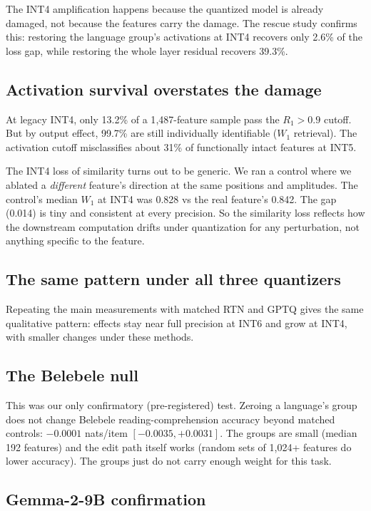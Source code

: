 \documentclass[11pt]{article}
\begin{document}
The INT4 amplification happens because the quantized model is already damaged, not because the features carry the damage. The rescue study confirms this: restoring the language group's activations at INT4 recovers only 2.6\% of the loss gap, while restoring the whole layer residual recovers 39.3\%.

\subsection{Activation survival overstates the damage}

At legacy INT4, only 13.2\% of a 1{,}487-feature sample pass the $R_1 > 0.9$ cutoff. But by output effect, 99.7\% are still individually identifiable ($W_1$ retrieval). The activation cutoff misclassifies about 31\% of functionally intact features at INT5.

The INT4 loss of similarity turns out to be generic. We ran a control where we ablated a \textit{different} feature's direction at the same positions and amplitudes. The control's median $W_1$ at INT4 was 0.828 vs the real feature's 0.842. The gap (0.014) is tiny and consistent at every precision. So the similarity loss reflects how the downstream computation drifts under quantization for any perturbation, not anything specific to the feature.

\subsection{The same pattern under all three quantizers}

Repeating the main measurements with matched RTN and GPTQ gives the same qualitative pattern: effects stay near full precision at INT6 and grow at INT4, with smaller changes under these methods.

\subsection{The Belebele null}

This was our only confirmatory (pre-registered) test. Zeroing a language's group does not change Belebele reading-comprehension accuracy beyond matched controls: $-0.0001$ nats/item $[-0.0035, +0.0031]$. The groups are small (median 192 features) and the edit path itself works (random sets of 1{,}024+ features do lower accuracy). The groups just do not carry enough weight for this task.

\subsection{Gemma-2-9B confirmation}
\end{document}
